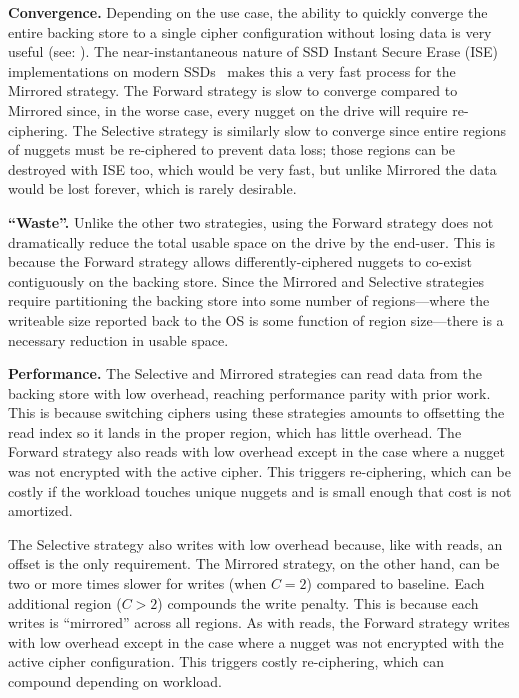 \textbf{Convergence.} Depending on the use case, the ability to quickly converge
the entire backing store to a single cipher configuration without losing data is
very useful (see: ). The near-instantaneous nature of SSD
Instant Secure Erase (ISE) implementations on modern SSDs~\cite{ISE1,ISE2,ISE3}
makes this a very fast process for the Mirrored strategy. The Forward strategy
is slow to converge compared to Mirrored since, in the worse case, every nugget
on the drive will require re-ciphering. The Selective strategy is similarly slow
to converge since entire regions of nuggets must be re-ciphered to prevent data
loss; those regions can be destroyed with ISE too, which would be very fast, but
unlike Mirrored the data would be lost forever, which is rarely desirable.

\textbf{``Waste''.} Unlike the other two strategies, using the Forward strategy
does not dramatically reduce the total usable space on the drive by the
end-user. This is because the Forward strategy allows differently-ciphered
nuggets to co-exist contiguously on the backing store. Since the Mirrored and
Selective strategies require partitioning the backing store into some number of
regions---where the writeable size reported back to the OS is some function of
region size---there is a necessary reduction in usable space.

\textbf{Performance.} The Selective and Mirrored strategies can read data from
the backing store with low overhead, reaching performance parity with prior
work. This is because switching ciphers using these strategies amounts to
offsetting the read index so it lands in the proper region, which has little
overhead. The Forward strategy also reads with low overhead except in the case
where a nugget was not encrypted with the active cipher. This triggers
re-ciphering, which can be costly if the workload touches unique nuggets and is
small enough that cost is not amortized.

The Selective strategy also writes with low overhead because, like with reads,
an offset is the only requirement. The Mirrored strategy, on the other hand, can
be two or more times slower for writes (when $C = 2$) compared to baseline. Each
additional region ($C > 2$) compounds the write penalty. This is because each
writes is ``mirrored'' across all regions. As with reads, the Forward strategy
writes with low overhead except in the case where a nugget was not
encrypted with the active cipher configuration. This triggers costly
re-ciphering, which can compound depending on workload.\\

